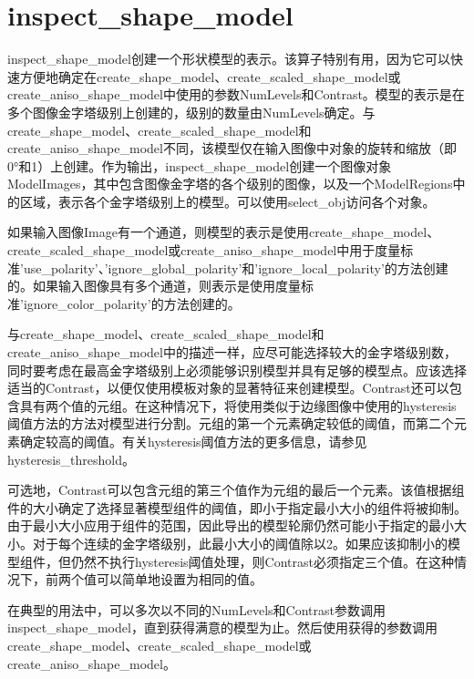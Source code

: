 \documentclass{article}
\begin{document}
\section{inspect\_shape\_model}
inspect\_shape\_model创建一个形状模型的表示。该算子特别有用，因为它可以快速方便地确定在create\_shape\_model、create\_scaled\_shape\_model或create\_aniso\_shape\_model中使用的参数NumLevels和Contrast。模型的表示是在多个图像金字塔级别上创建的，级别的数量由NumLevels确定。与create\_shape\_model、create\_scaled\_shape\_model和create\_aniso\_shape\_model不同，该模型仅在输入图像中对象的旋转和缩放（即0°和1）上创建。作为输出，inspect\_shape\_model创建一个图像对象ModelImages，其中包含图像金字塔的各个级别的图像，以及一个ModelRegions中的区域，表示各个金字塔级别上的模型。可以使用select\_obj访问各个对象。

如果输入图像Image有一个通道，则模型的表示是使用create\_shape\_model、create\_scaled\_shape\_model或create\_aniso\_shape\_model中用于度量标准'use\_polarity'、'ignore\_global\_polarity'和'ignore\_local\_polarity'的方法创建的。如果输入图像具有多个通道，则表示是使用度量标准'ignore\_color\_polarity'的方法创建的。

与create\_shape\_model、create\_scaled\_shape\_model和create\_aniso\_shape\_model中的描述一样，应尽可能选择较大的金字塔级别数，同时要考虑在最高金字塔级别上必须能够识别模型并具有足够的模型点。应该选择适当的Contrast，以便仅使用模板对象的显著特征来创建模型。Contrast还可以包含具有两个值的元组。在这种情况下，将使用类似于边缘图像中使用的hysteresis阈值方法的方法对模型进行分割。元组的第一个元素确定较低的阈值，而第二个元素确定较高的阈值。有关hysteresis阈值方法的更多信息，请参见hysteresis\_threshold。

可选地，Contrast可以包含元组的第三个值作为元组的最后一个元素。该值根据组件的大小确定了选择显著模型组件的阈值，即小于指定最小大小的组件将被抑制。由于最小大小应用于组件的范围，因此导出的模型轮廓仍然可能小于指定的最小大小。对于每个连续的金字塔级别，此最小大小的阈值除以2。如果应该抑制小的模型组件，但仍然不执行hysteresis阈值处理，则Contrast必须指定三个值。在这种情况下，前两个值可以简单地设置为相同的值。

在典型的用法中，可以多次以不同的NumLevels和Contrast参数调用inspect\_shape\_model，直到获得满意的模型为止。然后使用获得的参数调用create\_shape\_model、create\_scaled\_shape\_model或create\_aniso\_shape\_model。
\end{document}
